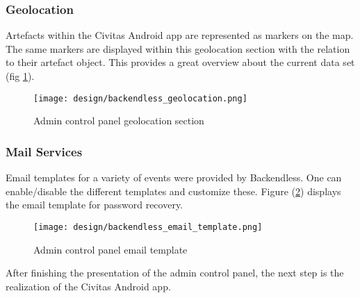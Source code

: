 \subsubsection*{Geolocation}
Artefacts within the Civitas Android app are represented as markers on the map. The same markers are displayed within this geolocation section with the relation to their artefact object. This provides a great overview about the current data set (fig \ref{fig:backendless_geolocation}).

\begin{figure}[H]
	\centering \texttt{[image: design/backendless\_geolocation.png]}
	\caption{Admin control panel geolocation section}
	\label{fig:backendless_geolocation}
\end{figure}

\subsubsection*{Mail Services}
Email templates for a variety of events were provided by Backendless. One can enable/disable the different templates and customize these. Figure (\ref{fig:backendless_email_template}) displays the email template for password recovery.

\begin{figure}[H]
	\centering \texttt{[image: design/backendless\_email\_template.png]}
	\caption{Admin control panel email template}
	\label{fig:backendless_email_template}
\end{figure}


After finishing the presentation of the admin control panel, the next step is the realization of the Civitas Android app.

